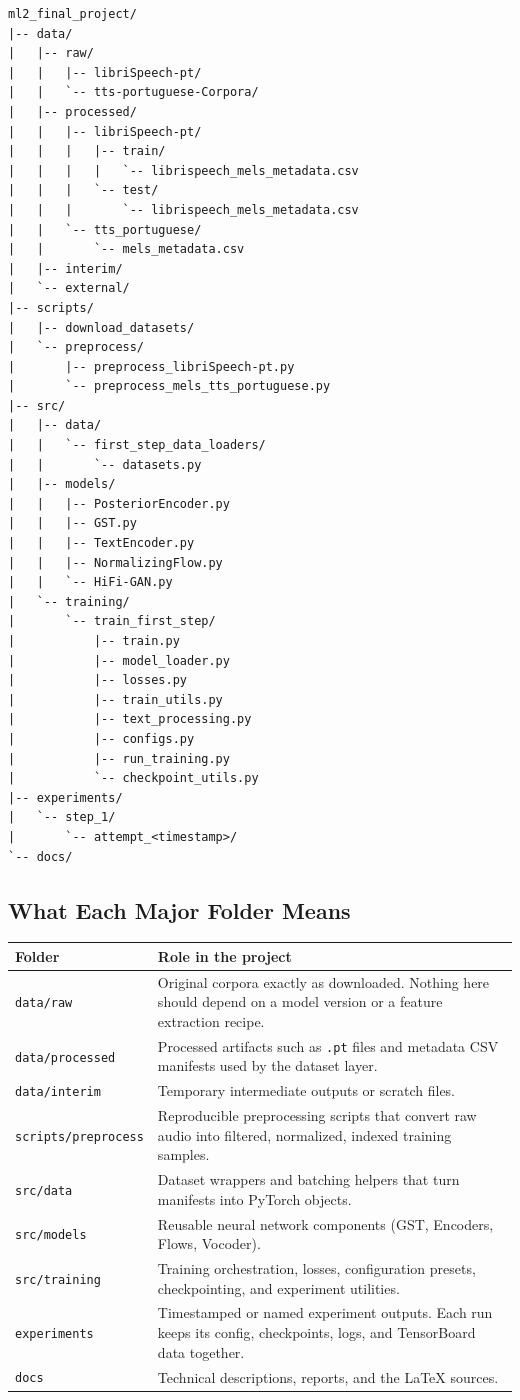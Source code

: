 \documentclass[11pt]{article}
\newcommand{\pathtt}[1]{\texttt{#1}}
\begin{document}
\begin{lstlisting}
ml2_final_project/
|-- data/
|   |-- raw/
|   |   |-- libriSpeech-pt/
|   |   `-- tts-portuguese-Corpora/
|   |-- processed/
|   |   |-- libriSpeech-pt/
|   |   |   |-- train/
|   |   |   |   `-- librispeech_mels_metadata.csv
|   |   |   `-- test/
|   |   |       `-- librispeech_mels_metadata.csv
|   |   `-- tts_portuguese/
|   |       `-- mels_metadata.csv
|   |-- interim/
|   `-- external/
|-- scripts/
|   |-- download_datasets/
|   `-- preprocess/
|       |-- preprocess_libriSpeech-pt.py
|       `-- preprocess_mels_tts_portuguese.py
|-- src/
|   |-- data/
|   |   `-- first_step_data_loaders/
|   |       `-- datasets.py
|   |-- models/
|   |   |-- PosteriorEncoder.py
|   |   |-- GST.py
|   |   |-- TextEncoder.py
|   |   |-- NormalizingFlow.py
|   |   `-- HiFi-GAN.py
|   `-- training/
|       `-- train_first_step/
|           |-- train.py
|           |-- model_loader.py
|           |-- losses.py
|           |-- train_utils.py
|           |-- text_processing.py
|           |-- configs.py
|           |-- run_training.py
|           `-- checkpoint_utils.py
|-- experiments/
|   `-- step_1/
|       `-- attempt_<timestamp>/
`-- docs/
\end{lstlisting}

\subsection{What Each Major Folder Means}

\begin{longtable}{>{\raggedright\arraybackslash}p{} >{\raggedright\arraybackslash}p{}}
\toprule
\textbf{Folder} & \textbf{Role in the project} \\
\midrule
\pathtt{data/raw} & Original corpora exactly as downloaded. Nothing here should depend on a model version or a feature extraction recipe. \\
\pathtt{data/processed} & Processed artifacts such as \pathtt{.pt} files and metadata CSV manifests used by the dataset layer. \\
\pathtt{data/interim} & Temporary intermediate outputs or scratch files. \\
\pathtt{scripts/preprocess} & Reproducible preprocessing scripts that convert raw audio into filtered, normalized, indexed training samples. \\
\pathtt{src/data} & Dataset wrappers and batching helpers that turn manifests into PyTorch objects. \\
\pathtt{src/models} & Reusable neural network components (GST, Encoders, Flows, Vocoder). \\
\pathtt{src/training} & Training orchestration, losses, configuration presets, checkpointing, and experiment utilities. \\
\pathtt{experiments} & Timestamped or named experiment outputs. Each run keeps its config, checkpoints, logs, and TensorBoard data together. \\
\pathtt{docs} & Technical descriptions, reports, and the LaTeX sources. \\
\bottomrule
\end{longtable}
\end{document}
